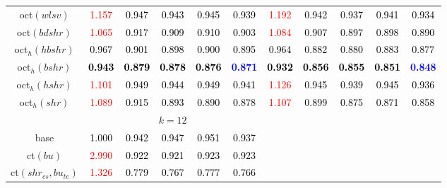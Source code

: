 \begin{tabular}[t]{c|>{}cccc>{}c|ccccc}
oct$(wlsv)$ & \textcolor{red}{1.157} & \textcolor{black}{0.947} & \textcolor{black}{0.943} & \textcolor{black}{0.945} & \textcolor{black}{0.939} & \textcolor{red}{1.192} & \textcolor{black}{0.942} & \textcolor{black}{0.937} & \textcolor{black}{0.941} & \textcolor{black}{0.934}\\
oct$(bdshr)$ & \textcolor{red}{1.065} & \textcolor{black}{0.917} & \textcolor{black}{0.909} & \textcolor{black}{0.910} & \textcolor{black}{0.903} & \textcolor{red}{1.084} & \textcolor{black}{0.907} & \textcolor{black}{0.897} & \textcolor{black}{0.898} & \textcolor{black}{0.890}\\
oct$_h(hbshr)$ & \textcolor{black}{0.967} & \textcolor{black}{0.901} & \textcolor{black}{0.898} & \textcolor{black}{0.900} & \textcolor{black}{0.895} & \textcolor{black}{0.964} & \textcolor{black}{0.882} & \textcolor{black}{0.880} & \textcolor{black}{0.883} & \textcolor{black}{0.877}\\
oct$_h(bshr)$ & \textcolor{black}{\textbf{0.943}} & \textcolor{black}{\textbf{0.879}} & \textcolor{black}{\textbf{0.878}} & \textcolor{black}{\textbf{0.876}} & \textcolor{blue}{\textbf{0.871}} & \textcolor{black}{\textbf{0.932}} & \textcolor{black}{\textbf{0.856}} & \textcolor{black}{\textbf{0.855}} & \textcolor{black}{\textbf{0.851}} & \textcolor{blue}{\textbf{0.848}}\\
oct$_h(hshr)$ & \textcolor{red}{1.101} & \textcolor{black}{0.949} & \textcolor{black}{0.944} & \textcolor{black}{0.949} & \textcolor{black}{0.941} & \textcolor{red}{1.126} & \textcolor{black}{0.945} & \textcolor{black}{0.939} & \textcolor{black}{0.945} & \textcolor{black}{0.936}\\
oct$_h(shr)$ & \textcolor{red}{1.089} & \textcolor{black}{0.915} & \textcolor{black}{0.893} & \textcolor{black}{0.890} & \textcolor{black}{0.878} & \textcolor{red}{1.107} & \textcolor{black}{0.899} & \textcolor{black}{0.875} & \textcolor{black}{0.871} & \textcolor{black}{0.858}\\
\addlinespace[0.3em]
\multicolumn{1}{c}{} & \multicolumn{5}{c}{\textbf{$k = 12$}} & \multicolumn{5}{c}{}\\
base & \textcolor{black}{1.000} & \textcolor{black}{0.942} & \textcolor{black}{0.947} & \textcolor{black}{0.951} & \textcolor{black}{0.937} &  &  &  &  & \\
ct$(bu)$ & \textcolor{red}{2.990} & \textcolor{black}{0.922} & \textcolor{black}{0.921} & \textcolor{black}{0.923} & \textcolor{black}{0.923} &  &  &  &  & \\
ct$(shr_{cs}, bu_{te})$ & \textcolor{red}{1.326} & \textcolor{black}{0.779} & \textcolor{black}{0.767} & \textcolor{black}{0.777} & \textcolor{black}{0.766} &  &  &  &  & \\

\end{tabular}
